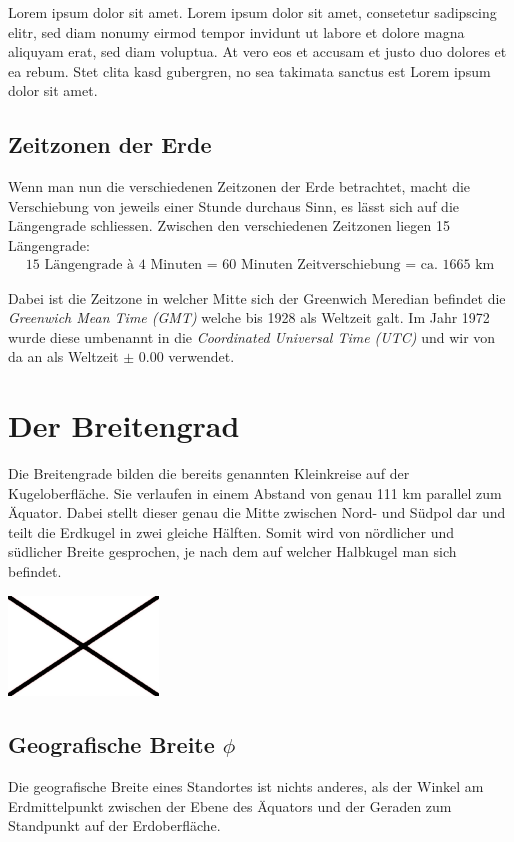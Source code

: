 \begin{refsection}
Lorem ipsum dolor sit amet. Lorem ipsum dolor sit amet, consetetur sadipscing elitr, sed diam nonumy eirmod tempor invidunt ut labore et dolore magna aliquyam erat, sed diam voluptua. At vero eos et accusam et justo duo dolores et ea rebum. Stet clita kasd gubergren, no sea takimata sanctus est Lorem ipsum dolor sit amet.

\subsection{Zeitzonen der Erde}
Wenn man nun die verschiedenen Zeitzonen der Erde betrachtet, macht die Verschiebung von jeweils einer Stunde durchaus Sinn, es lässt sich auf die Längengrade schliessen.
Zwischen den verschiedenen Zeitzonen liegen 15 Längengrade:
\begin{align*}
\text{15 Längengrade à 4 Minuten = 60 Minuten Zeitverschiebung = ca. 1665 km}
\end{align*}

Dabei ist die Zeitzone in welcher Mitte sich der Greenwich Meredian befindet die \textit{Greenwich Mean Time (GMT)} welche bis 1928 als Weltzeit galt. Im Jahr 1972 wurde diese umbenannt in die \textit{Coordinated Universal Time (UTC)} und wir von da an als Weltzeit $\pm$ 0.00 verwendet.


\section{Der Breitengrad}
Die Breitengrade bilden die bereits genannten Kleinkreise auf der Kugeloberfläche. Sie verlaufen in einem Abstand von genau 111 km parallel zum Äquator. Dabei stellt  dieser genau die Mitte zwischen Nord- und Südpol dar und teilt die Erdkugel in zwei gleiche Hälften. Somit wird von nördlicher und südlicher Breite gesprochen, je nach dem auf welcher Halbkugel man sich befindet.

\begin{center}
        \includegraphics[width=0.3\textwidth]{kugel/Beispielbild.jpg}
\end{center}


\subsection{Geografische Breite $\phi$}
\begin{definition}
Die geografische Breite eines Standortes ist nichts anderes, als der Winkel am Erdmittelpunkt zwischen der Ebene des Äquators und der Geraden zum Standpunkt auf der Erdoberfläche.
\end{definition}


\end{refsection}

